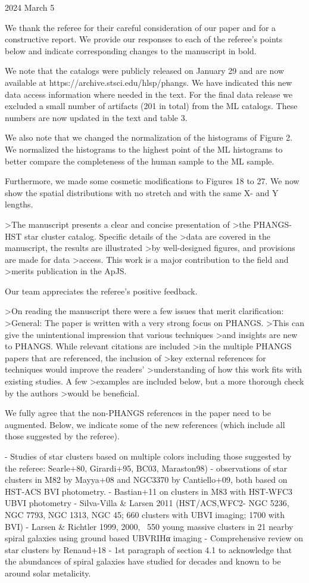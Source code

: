 2024 March 5

We thank the referee for their careful consideration of our paper and for a constructive report.  We provide our responses to each of the referee's points below and indicate corresponding changes to the manuscript in bold.  

We note that the catalogs were publicly released on January 29 and are now available at https://archive.stsci.edu/hlsp/phangs.  We have indicated this new data access information where needed in the text. For the final data release we excluded a small number of artifacts (201 in total) from the ML catalogs. These numbers are now updated in the text and table 3.

We also note that we changed the normalization of the histograms of Figure 2. We normalized the histograms to the highest point of the ML histograms to better compare the completeness of the human sample to the ML sample.

Furthermore, we made some cosmetic modifications to Figures 18 to 27. We now show the spatial distributions with no stretch and with the same X- and Y lengths. 

>The manuscript presents a clear and concise presentation of 
>the PHANGS-HST star cluster catalog. Specific details of the 
>data are covered in the manuscript, the results are illustrated 
>by well-designed figures, and provisions are made for data 
>access. This work is a major contribution to the field and 
>merits publication in the ApJS.

Our team appreciates the referee's positive feedback.  

>On reading the manuscript there were a few issues that merit clarification:
>General: The paper is written with a very strong focus on PHANGS. 
>This can give the unintentional impression that various techniques 
>and insights are new to PHANGS. While relevant citations are included 
>in the multiple PHANGS papers that are referenced, the inclusion of 
>key external references for techniques would improve the readers' 
>understanding of how this work fits with existing studies. A few 
>examples are included below, but a more thorough check by the authors 
>would be beneficial.

We fully agree that the non-PHANGS references in the paper need to be augmented.  Below, we indicate some of the new references (which include all those suggested by the referee).

- Studies of star clusters based on multiple colors including those suggested by the referee: Searle+80, Girardi+95, BC03, Maraston98)
- observations of star clusters in M82 by Mayya+08 and NGC3370 by Cantiello+09, both based on HST-ACS BVI photometry.
-  Bastian+11 on clusters in M83 with HST-WFC3 UBVI photometry
- Silva-Villa & Larsen 2011 (HST/ACS,WFC2- NGC 5236, NGC 7793, NGC 1313, NGC 45; 660 clusters with UBVI imaging; 1700 with BVI) 
- Larsen & Richtler 1999, 2000, ~550 young massive clusters in 21 nearby spiral galaxies using ground based UBVRIHα imaging
- Comprehensive review on star clusters by Renaud+18 
- 1st paragraph of section 4.1 to acknowledge that the abundances of spiral galaxies have studied for decades and known to be around solar metalicity.



